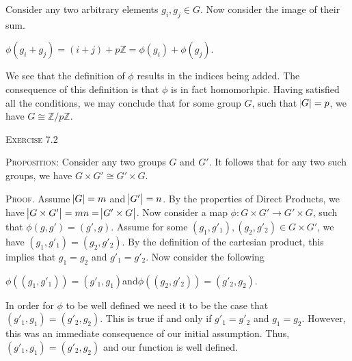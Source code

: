 \documentclass[12pt, a4paper]{article}
\begin{document}
    Consider any two arbitrary elements $g_i,g_j\in G$. Now consider the image of their sum.\par
    
\vspace{4mm}

        \centerline{$\phi(g_i+g_j)=(i+j)+p\mathbb{Z}=\phi(g_i)+\phi(g_j)$.}
        
\vspace{4mm}

    We see that the definition of $\phi$ results in the indices being added. The consequence of this definition is that $\phi$ is in fact homomorhpic. Having satisfied all the conditions, we may conclude that for some group $G$, such that $\abs{G}=p$, we have $G\cong\mathbb{Z}/p\mathbb{Z}$.
    
\newpage

\begin{flushleft}
    \textsc{Exercise 7.2}
\end{flushleft}

    \textsc{Proposition: }Consider any two groups $G$ and $G'$. It follows that for any two such groups, we have $G\times G'\cong G'\times G$.
    
\vspace{4mm}

    \textsc{Proof. }Assume $\abs{G}=m$ and $\abs{G'}=n$. By the properties of Direct Products, we have $\abs{G\times G'}=mn=\abs{G'\times G}$. Now consider a map $\phi\colon G\times G'\rightarrow G'\times G$, such that $\phi(g,g')=(g',g)$. Assume for some $(g_1,g'_1),(g_2,g'_2)\in G\times G'$, we have $(g_1,g'_1)=(g_2,g'_2)$. By the definition of the cartesian product, this implies that $g_1=g_2$ and $g'_1=g'_2$. Now consider the following\par
    
\vspace{4mm}

        \centerline{$\phi((g_1,g'_1))=(g'_1,g_1)$\hspace{5mm}and\hspace{5mm}$\phi((g_2,g'_2))=(g'_2,g_2)$.}
        
\vspace{4mm}

    In order for $\phi$ to be well defined we need it to be the case  that $(g'_1,g_1)=(g'_2,g_2)$. This is true if and only if $g'_1=g'_2$ and $g_1=g_2$. However, this was an immediate consequence of our initial assumption. Thus, $(g'_1,g_1)=(g'_2,g_2)$ and our function is well defined.\par
    
\end{document}
